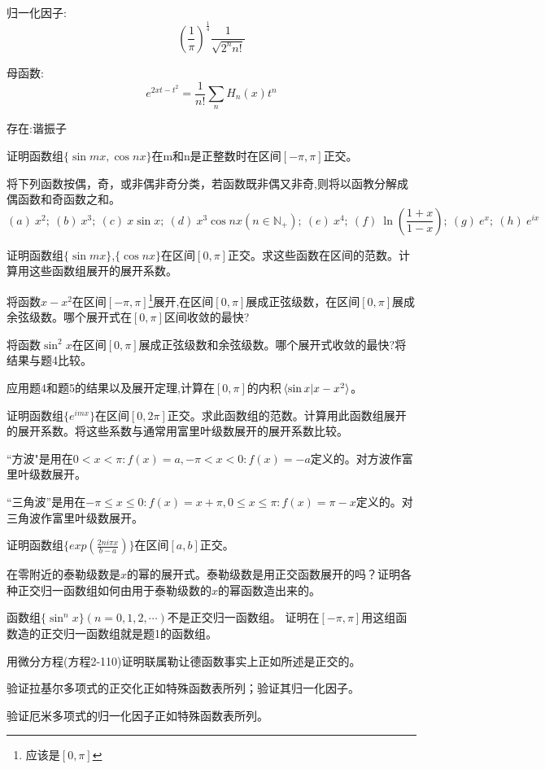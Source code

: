 归一化因子:
\[\left(\frac{1}{\pi}\right)^{\frac{1}{4}}\frac{1}{\sqrt{2^nn!}}\]

母函数:
\[e^{2xt-t^2}=\frac{1}{n!}\sum_nH_n(x)t^n\]

存在:谐振子

\begin{problemset}
    \item 证明函数组$\{\sin mx,\cos nx\}$在m和n是正整数时在区间$[-\pi,\pi]$正交。
    \item 将下列函数按偶，奇，或非偶非奇分类，若函数既非偶又非奇,则将以函教分解成偶函数和奇函数之和。
    \[(a) \ x^2; \ (b) \ x^3; \ (c) \ x\sin x; \ (d) \ x^3\cos nx(n \in \mathbb{N_+}); \ (e) \ x^4; \ (f) \ \ln\left(\frac{1+x}{1-x}\right); \ (g) \ e^x; \ (h) \ e^{ix}\]
    \item 证明函数组$\{\sin mx\}$,$\{\cos nx\}$在区间$[0,\pi]$正交。求这些函数在区间的范数。计算用这些函数组展开的展开系数。
    \item 将函数$x-x^2$在区间$[-\pi,\pi]$\footnote{应该是$[0,\pi]$}展开,在区间$[0,\pi]$展成正弦级数，在区间$[0,\pi]$展成余弦级数。哪个展开式在$[0,\pi]$区间收敛的最快?
    \item 将函数$\sin^2x$在区间$[0,\pi]$展成正弦级数和余弦级数。哪个展开式收敛的最快?将结果与题4比较。
    \item 应用题4和题5的结果以及展开定理,计算在$[0,π]$的内积$\bra*{\sin x}\ket*{x-x^2}$。
    \item 证明函数组$\{e^{imx}\}$在区间$[0,2π]$正交。求此函数组的范数。计算用此函数组展开的展开系数。将这些系数与通常用富里叶级数展开的展开系数比较。
    \item “方波"是用在$0<x<\pi:f(x)=a,-\pi<x<0:f(x)=-a$定义的。对方波作富里叶级数展开。
    \item “三角波”是用在$-π≤x≤0:f(x)=x+π,0≤x≤π:f(x)=π-x$定义的。对三角波作富里叶级数展开。
    \item 证明函数组$\{exp(\frac{2ni\pi x}{b-a})\}$在区间$[a,b]$正交。
    \item 在零附近的泰勒级数是$x$的幂的展开式。泰勒级数是用正交函数展开的吗？证明各种正交归一函数组如何由用于泰勒级数的$x$的幂函数造出来的。
    \item 函数组$\{\sin^nx\}(n=0,1,2,\cdots)$不是正交归一函数组。 证明在$[-\pi,\pi]$用这组函数造的正交归一函数组就是题1的函数组。
    \item 用微分方程(方程2-110)证明联属勒让德函数事实上正如所述是正交的。
    \item 验证拉基尔多项式的正交化正如特殊函数表所列；验证其归一化因子。
    \item 验证厄米多项式的归一化因子正如特殊函数表所列。

\end{problemset}
